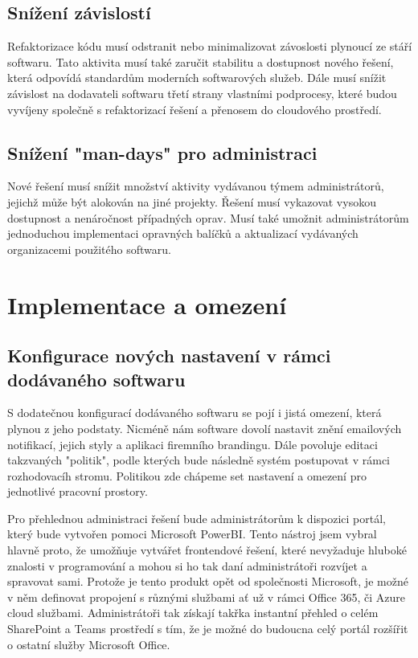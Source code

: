 \documentclass[12pt]{article}
\begin{document}
\begin{sloppypar}
\begin{spacing}{1.15}
        \subsection*{Snížení závislostí}
        Refaktorizace kódu musí odstranit nebo minimalizovat závoslosti plynoucí
        ze stáří softwaru. Tato aktivita musí také zaručit stabilitu a dostupnost
        nového řešení, která odpovídá standardům moderních softwarových služeb.
        Dále musí snížit závislost na dodavateli softwaru třetí strany vlastními
        podprocesy, které budou vyvíjeny společně s refaktorizací řešení a
        přenosem do cloudového prostředí.

        \subsection*{Snížení "man-days" pro administraci}
        Nové řešení musí snížit množství aktivity vydávanou týmem
        administrátorů, jejichž může být alokován na jiné projekty. Řešení musí
        vykazovat vysokou dostupnost a nenáročnost případných oprav. Musí také
        umožnit administrátorům jednoduchou implementaci opravných balíčků a
        aktualizací vydávaných organizacemi použitého softwaru. 

        \section*{Implementace a omezení}
        \subsection*{Konfigurace nových nastavení v rámci dodávaného softwaru}
        S dodatečnou konfigurací dodávaného softwaru se pojí i jistá omezení,
        která plynou z jeho podstaty. Nicméně nám software dovolí nastavit
        znění emailových notifikací, jejich styly a aplikaci firemního
        brandingu. Dále povoluje editaci takzvaných "politik", podle kterých
        bude následně systém postupovat v rámci rozhodovacíh stromu. Politikou
        zde chápeme set nastavení a omezení pro jednotlivé pracovní prostory.
        
        Pro přehlednou administraci řešení bude administrátorům k dispozici
        portál, který bude vytvořen pomoci Microsoft PowerBI. Tento nástroj jsem
        vybral hlavně proto, že umožňuje vytvářet frontendové řešení, které
        nevyžaduje hluboké znalosti v programování a mohou si ho tak daní
        administrátoři rozvíjet a spravovat sami. Protože je tento produkt opět
        od společnosti Microsoft, je možné v něm definovat propojení s různými
        službami ať už v rámci Office 365, či Azure cloud službami.
        Administrátoři tak získají takřka instantní přehled o celém SharePoint a
        Teams prostředí s tím, že je možné do budoucna celý portál rozšířit o
        ostatní služby Microsoft Office.


\end{spacing}
\end{sloppypar}
\end{document}
